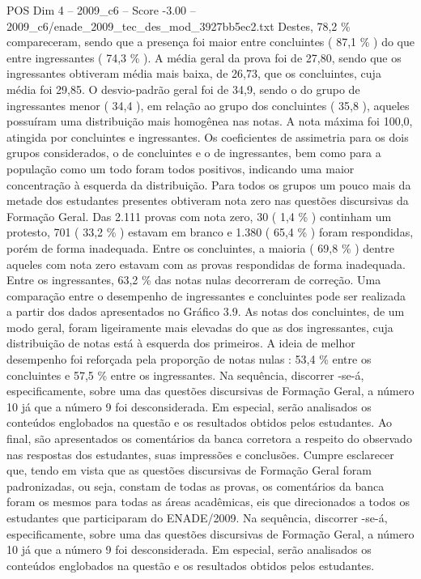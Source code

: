 \begin{textsample}{POS Dim 4 – 2009\_c6 – Score -3.00 – 2009\_c6/enade\_2009\_tec\_des\_mod\_3927bb5ec2.txt}
Destes, 78,2 \% compareceram, sendo que a presença foi maior entre concluintes ( 87,1 \% ) do que entre ingressantes ( 74,3 \% ).
A média geral da prova foi de 27,80, sendo que os ingressantes obtiveram média mais baixa, de 26,73, que os concluintes, cuja média foi 29,85.
O desvio-padrão geral foi de 34,9, sendo o do grupo de ingressantes menor ( 34,4 ), em relação ao grupo dos concluintes ( 35,8 ), aqueles possuíram uma distribuição mais homogênea nas notas.
A nota máxima foi 100,0, atingida por concluintes e ingressantes.
Os coeficientes de assimetria para os dois grupos considerados, o de concluintes e o de ingressantes, bem como para a população como um todo foram todos positivos, indicando uma maior concentração à esquerda da distribuição.
Para todos os grupos um pouco mais da metade dos estudantes presentes obtiveram nota zero nas questões discursivas da Formação Geral.
Das 2.111 provas com nota zero, 30 ( 1,4 \% ) continham um protesto, 701 ( 33,2 \% ) estavam em branco e 1.380 ( 65,4 \% ) foram respondidas, porém de forma inadequada.
Entre os concluintes, a maioria ( 69,8 \% ) dentre aqueles com nota zero estavam com as provas respondidas de forma inadequada.
Entre os ingressantes, 63,2 \% das notas nulas decorreram de correção.
Uma comparação entre o desempenho de ingressantes e concluintes pode ser realizada a partir dos dados apresentados no Gráfico 3.9.
As notas dos concluintes, de um modo geral, foram ligeiramente mais elevadas do que as dos ingressantes, cuja distribuição de notas está à esquerda dos primeiros.
A ideia de melhor desempenho foi reforçada pela proporção de notas nulas : 53,4 \% entre os concluintes e 57,5 \% entre os ingressantes.
Na sequência, discorrer -se-á, especificamente, sobre uma das questões discursivas de Formação Geral, a número 10 já que a número 9 foi desconsiderada.
Em especial, serão analisados os conteúdos englobados na questão e os resultados obtidos pelos estudantes.
Ao final, são apresentados os comentários da banca corretora a respeito do observado nas respostas dos estudantes, suas impressões e conclusões.
Cumpre esclarecer que, tendo em vista que as questões discursivas de Formação Geral foram padronizadas, ou seja, constam de todas as provas, os comentários da banca foram os mesmos para todas as áreas acadêmicas, eis que direcionados a todos os estudantes que participaram do ENADE/2009.
Na sequência, discorrer -se-á, especificamente, sobre uma das questões discursivas de Formação Geral, a número 10 já que a número 9 foi desconsiderada.
Em especial, serão analisados os conteúdos englobados na questão e os resultados obtidos pelos estudantes.

\end{textsample}
